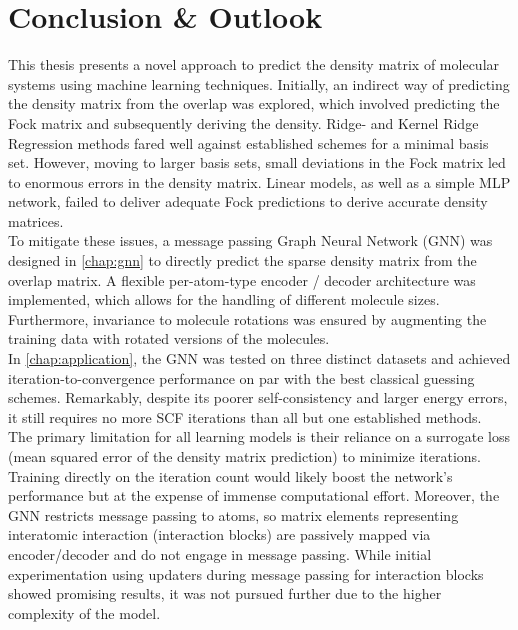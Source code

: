 \chapter{Conclusion \& Outlook}
\label{chap:conclusion}
This thesis presents a novel approach to predict the density matrix of molecular systems using machine learning techniques. 
Initially, an indirect way of predicting the density matrix from the overlap was explored, which involved predicting the Fock matrix and subsequently deriving the density. Ridge- and Kernel Ridge Regression methods fared well against established schemes for a minimal basis set. However, moving to larger basis sets, small deviations in the Fock matrix led to enormous errors in the density matrix. Linear models, as well as a simple MLP network, failed to deliver adequate Fock predictions to derive accurate density matrices.\\
To mitigate these issues, a message passing Graph Neural Network (GNN) was designed in \autoref{chap:gnn} to directly predict the sparse density matrix from the overlap matrix. A flexible per-atom-type encoder / decoder architecture was implemented, which allows for the handling of different molecule sizes. Furthermore, invariance to molecule rotations was ensured by augmenting the training data with rotated versions of the molecules. \\
In \autoref{chap:application}, the GNN was tested on three distinct datasets and achieved iteration-to-convergence performance on par with the best classical guessing schemes. Remarkably, despite its poorer self-consistency and larger energy errors, it still requires no more SCF iterations than all but one established methods.\\

The primary limitation for all learning models is their reliance on a surrogate loss (mean squared error of the density matrix prediction) to minimize iterations. Training directly on the iteration count would likely boost the network's performance but at the expense of immense computational effort. Moreover, the GNN restricts message passing to atoms, so matrix elements representing interatomic interaction (interaction blocks) are passively mapped via encoder/decoder and do not engage in message passing. While initial experimentation using updaters during message passing for interaction blocks showed promising results, it was not pursued further due to the higher complexity of the model.\\

